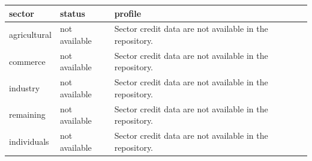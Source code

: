 ﻿%
\begin{tabular}{lll}
\hline
sector & status & profile \\
\hline
agricultural & not available & Sector credit data are not available in the repository. \\
commerce & not available & Sector credit data are not available in the repository. \\
industry & not available & Sector credit data are not available in the repository. \\
remaining & not available & Sector credit data are not available in the repository. \\
individuals & not available & Sector credit data are not available in the repository. \\
\hline
\end{tabular}

